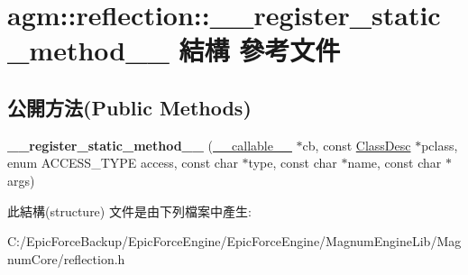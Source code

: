 \hypertarget{structagm_1_1reflection_1_1____register__static__method____}{}\section{agm\+:\+:reflection\+:\+:\+\_\+\+\_\+register\+\_\+static\+\_\+method\+\_\+\+\_\+ 結構 參考文件}
\label{structagm_1_1reflection_1_1____register__static__method____}
\subsection*{公開方法(Public Methods)}
\begin{DoxyCompactItemize}
\item 
{\bfseries \+\_\+\+\_\+register\+\_\+static\+\_\+method\+\_\+\+\_\+} (\hyperlink{structagm_1_1reflection_1_1____callable____}{\+\_\+\+\_\+callable\+\_\+\+\_\+} $\ast$cb, const \hyperlink{classagm_1_1reflection_1_1_class_desc}{Class\+Desc} $\ast$pclass, enum A\+C\+C\+E\+S\+S\+\_\+\+T\+Y\+PE access, const char $\ast$type, const char $\ast$name, const char $\ast$args)\hypertarget{structagm_1_1reflection_1_1____register__static__method_____a0dbfa9fc6bb0a93ece08975dc4afd982}{}\label{structagm_1_1reflection_1_1____register__static__method_____a0dbfa9fc6bb0a93ece08975dc4afd982}

\end{DoxyCompactItemize}


此結構(structure) 文件是由下列檔案中產生\+:\begin{DoxyCompactItemize}
\item 
C\+:/\+Epic\+Force\+Backup/\+Epic\+Force\+Engine/\+Epic\+Force\+Engine/\+Magnum\+Engine\+Lib/\+Magnum\+Core/reflection.\+h\end{DoxyCompactItemize}
